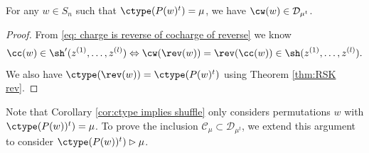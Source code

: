 \begin{coro}\label{cor:ctype implies shuffle}
    For any $w\in S_n$ such that $\ctype(P(w)^t) =\mu$, we have $\cw(w)\in \mathcal{D}_{\mu^t}$.
\end{coro}
\begin{proof}
    From  \eqref{eq: charge is reverse of cocharge of reverse} we know  \[\cc(w) \in \sh'(z^{(1)},\dots , z^{(l)}) \Leftrightarrow\cw(\rev(w))= \rev(\cc(w)) \in \sh(z^{(1)},\dots , z^{(l)}).\]
    We also have $\ctype(\rev(w)) = \ctype(P(w)^t)$ using Theorem \ref{thm:RSK rev}.
\end{proof}

Note that Corollary \ref{cor:ctype implies shuffle} only considers permutations $w$ with $\ctype(P(w))^t) = \mu$. To prove the inclusion $\mathcal{C}_\mu \subset \mathcal{D}_{\mu^t}$, we extend this argument to consider $\ctype(P(w))^t) \rhd  \mu$.

